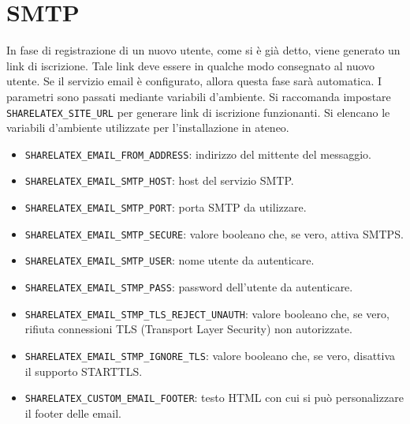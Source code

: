 \section{SMTP}
\label{SMTP}
In fase di registrazione di un nuovo utente, come si è già detto, viene generato un link di iscrizione. Tale link deve essere in qualche modo consegnato al nuovo utente. Se il servizio email è configurato, allora questa fase sarà automatica. I parametri sono passati mediante variabili d'ambiente. Si raccomanda impostare \verb|SHARELATEX_SITE_URL| per generare link di iscrizione funzionanti. Si elencano le variabili d'ambiente utilizzate per l'installazione in ateneo.
\begin{itemize}
    \item \verb|SHARELATEX_EMAIL_FROM_ADDRESS|: indirizzo del mittente del messaggio.
    \item \verb|SHARELATEX_EMAIL_SMTP_HOST|: host del servizio SMTP.
    \item \verb|SHARELATEX_EMAIL_SMTP_PORT|: porta SMTP da utilizzare.
    \item \verb|SHARELATEX_EMAIL_SMTP_SECURE|: valore booleano che, se vero, attiva SMTPS.
    \item \verb|SHARELATEX_EMAIL_SMTP_USER|: nome utente da autenticare.
    \item \verb|SHARELATEX_EMAIL_STMP_PASS|: password dell'utente da autenticare.
    \item \verb|SHARELATEX_EMAIL_STMP_TLS_REJECT_UNAUTH|: valore booleano che, se vero, rifiuta connessioni TLS (Transport Layer Security) non autorizzate.
    \item \verb|SHARELATEX_EMAIL_STMP_IGNORE_TLS|: valore booleano che, se vero, disattiva il supporto STARTTLS.
    \item \verb|SHARELATEX_CUSTOM_EMAIL_FOOTER|: testo HTML con cui si può personalizzare il footer delle email.
\end{itemize}